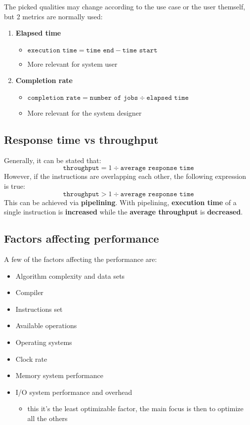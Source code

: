 \documentclass[english]{article}
\begin{document}
The picked qualities may change according to the use case or the user themself,
but 2 metrics are normally used:

\begin{enumerate}
  \item \textbf{Elapsed time}
        \begin{itemize}
          \item \(\texttt{execution time} = \texttt{time end} - \texttt{time start}\)
          \item More relevant for system user
        \end{itemize}
  \item \textbf{Completion rate}
        \begin{itemize}
          \item \(\texttt{completion rate} = \texttt{number of jobs} \div \texttt{elapsed time}\)
          \item More relevant for the system designer
        \end{itemize}
\end{enumerate}

\subsection{Response time vs throughput}

Generally, it can be stated that:
\[ \texttt{throughput} = {1} \div { \texttt{average response time}} \]
However, if the instructions are overlapping each other, the following expression is true:
\[ \texttt{throughput} > {1} \div {\texttt{average response time}} \]
This can be achieved via \textbf{pipelining}.
With pipelining, \textbf{execution time} of a single instruction is \textbf{increased} while the \textbf{average throughput} is \textbf{decreased}.

\subsection{Factors affecting performance}

A few of the factors affecting the performance are:

\begin{itemize}
  \item Algorithm complexity and data sets
  \item Compiler
  \item Instructions set
  \item Available operations
  \item Operating systems
  \item Clock rate
  \item Memory system performance
  \item I/O system performance and overhead
        \begin{itemize}
          \item this it's the least optimizable factor, the main focus is then to optimize all the others
        \end{itemize}
\end{itemize}
\end{document}
